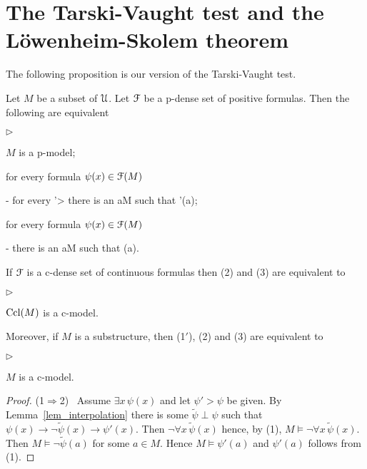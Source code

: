\documentclass{amsproc}
\newcommand{\mylabel}[1]{{#1}\hfill}
\renewenvironment{itemize}
  {\begin{list}{$\triangleright$}{%
  \setlength{\parskip}{0mm}
  \setlength{\topsep}{.4\baselineskip}
  \setlength{\rightmargin}{0mm}
  \setlength{\listparindent}{0mm}
  \setlength{\itemindent}{0mm}
  \setlength{\labelwidth}{3ex}
  \setlength{\itemsep}{.2\baselineskip}
  \setlength{\parsep}{.2\baselineskip}
  \setlength{\partopsep}{0mm}
  \setlength{\labelsep}{1ex}
  \setlength{\leftmargin}{\labelwidth+\labelsep}
  \let\makelabel\mylabel}}{%
\end{list}}
\begin{document}
{%
\section{The Tarski-Vaught test and the L\"owenheim-Skolem theorem}

The following proposition is our version of the Tarski-Vaught test.

\begin{theorem}\label{thm_Tarski_Vaught}
  Let $M$ be a subset of ${\EuScript U}$.
  Let ${\EuScript F}$ be a p-dense set of positive formulas.
  Then the following are equivalent
  \begin{itemize}
    \item[1.] $M$ is a p-model;
    \item[2.] for every formula $\psi(x)\in{\EuScript F}(M)$
    
    \noindent\kern-\leftmargin
    {\textrm{ for every }\psi'>\psi\textrm{ there is an }a\in M\textrm{ such that }\psi'(a);}
  
    \item[3.] for every formula $\psi(x)\in{\EuScript F}(M)$
    
    \noindent\kern-\leftmargin
    {\textrm{ there is an }a\in M\textrm{ such that }\neg\psi(a).}
  \end{itemize}
  If ${\EuScript F}$ is a c-dense set of continuous formulas then (2) and (3) are equivalent to
  \begin{itemize}
    \item[1$'$.] ${\rm Ccl}(M)$ is a c-model.
  \end{itemize}
  Moreover, if $M$ is a substructure, then (1$'$), (2) and (3) are equivalent to
  \begin{itemize}
    \item[1$''$.] $M$ is a c-model.
  \end{itemize}
\end{theorem}

\begin{proof}
  (1$\Rightarrow$2) \ 
  Assume $\exists x\,\psi(x)$ and let $\psi'>\psi$ be given.
  By Lemma~\ref{lem_interpolation} there is some $\tilde{\psi}\perp\psi$ such that  $\psi(x)\rightarrow\neg\tilde{\psi}(x)\rightarrow\psi'(x)$.
  Then $\neg\forall x\,\tilde{\psi}(x)$ hence, by (1), $M\models\neg\forall x\,\tilde{\psi}(x)$.
  Then $M\models\neg\tilde{\psi}(a)$ for some $a\in M$. Hence $M\models\psi'(a)$ and $\psi'(a)$ follows from (1).


\end{proof}}
\end{document}
